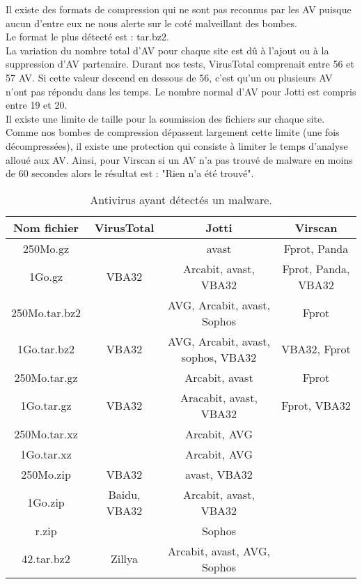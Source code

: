 \documentclass{svjour3}
\begin{document}
Il existe des formats de compression qui ne sont pas reconnus par les AV puisque aucun d'entre eux ne nous alerte sur le coté malveillant des bombes.\\
Le format le plus détecté est : tar.bz2.\\
La variation du nombre total d'AV pour chaque site est dû à l'ajout ou à la suppression d'AV partenaire. Durant nos tests, VirusTotal comprenait entre 56 et 57 AV. Si cette valeur descend en dessous de 56, c'est qu'un ou plusieurs AV n'ont pas répondu dans les temps. Le nombre normal d'AV pour Jotti est compris entre 19 et 20.\\
Il existe une limite de taille pour la soumission des fichiers sur chaque site. Comme nos bombes de compression dépassent largement cette limite (une fois décompressées), il existe une protection qui consiste à limiter le temps d'analyse alloué aux AV. Ainsi, pour Virscan si un AV n'a pas trouvé de malware en moins de 60 secondes alors le résultat est : "Rien n'a été trouvé".
\begin{table}[ht!]
\begin{tabular}{|c|c|c|c|}
    \hline
     \textbf{Nom fichier} & \textbf{VirusTotal} & \textbf{Jotti} & \textbf{Virscan} \\
     \hline
    250Mo.gz &  & avast & Fprot, Panda\\
    \hline
    1Go.gz & VBA32 & Arcabit, avast, VBA32 & Fprot, Panda, VBA32\\
    \hline
    \hline
    250Mo.tar.bz2 & & AVG, Arcabit, avast, Sophos & Fprot\\
    \hline
    1Go.tar.bz2 & VBA32 & AVG, Arcabit, avast, sophos, VBA32 & VBA32, Fprot\\
    \hline
    \hline
    250Mo.tar.gz & & Arcabit, avast & Fprot\\
    \hline
    1Go.tar.gz & VBA32 & Aracabit, avast, VBA32 & Fprot, VBA32\\
    \hline
    \hline
    250Mo.tar.xz & & Arcabit, AVG & \\
    \hline
    1Go.tar.xz & & Arcabit, AVG & \\
    \hline
    \hline
    250Mo.zip & VBA32 & avast, VBA32 & \\
    \hline
    1Go.zip & Baidu, VBA32 & Arcabit, avast, VBA32 & \\
    \hline
    r.zip &  & Sophos  & \\
    \hline
    \hline
    42.tar.bz2 & Zillya & Arcabit, avast, AVG, Sophos  & \\
    \hline
\end{tabular}
\caption{Antivirus ayant détectés un malware.}
\end{table}
\end{document}
